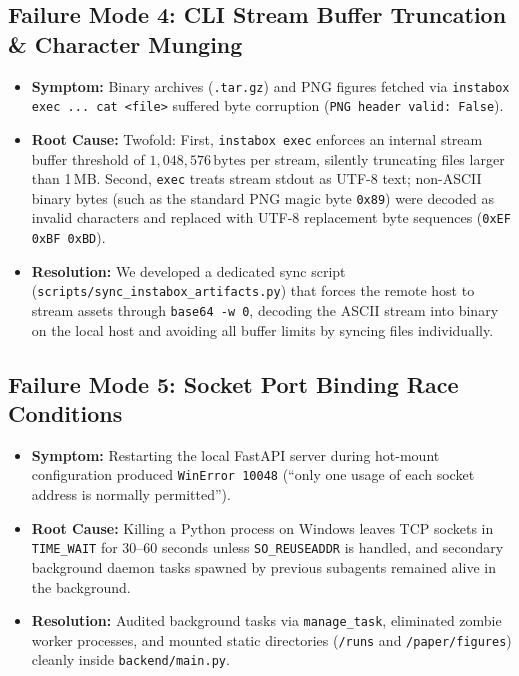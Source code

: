 \documentclass[11pt,a4paper]{article}
\begin{document}
\subsection{Failure Mode 4: CLI Stream Buffer Truncation \& Character Munging}
\begin{itemize}
    \item \textbf{Symptom:} Binary archives (\texttt{.tar.gz}) and PNG figures fetched via \texttt{instabox exec ... cat <file>} suffered byte corruption (\texttt{PNG header valid: False}).
    \item \textbf{Root Cause:} Twofold: First, \texttt{instabox exec} enforces an internal stream buffer threshold of $1,048,576\,\text{bytes}$ per stream, silently truncating files larger than 1\,MB. Second, \texttt{exec} treats stream stdout as UTF-8 text; non-ASCII binary bytes (such as the standard PNG magic byte \texttt{0x89}) were decoded as invalid characters and replaced with UTF-8 replacement byte sequences (\texttt{0xEF 0xBF 0xBD}).
    \item \textbf{Resolution:} We developed a dedicated sync script (\texttt{scripts/sync\_instabox\_artifacts.py}) that forces the remote host to stream assets through \texttt{base64 -w 0}, decoding the ASCII stream into binary on the local host and avoiding all buffer limits by syncing files individually.
\end{itemize}

\subsection{Failure Mode 5: Socket Port Binding Race Conditions}
\begin{itemize}
    \item \textbf{Symptom:} Restarting the local FastAPI server during hot-mount configuration produced \texttt{WinError 10048} (``only one usage of each socket address is normally permitted'').
    \item \textbf{Root Cause:} Killing a Python process on Windows leaves TCP sockets in \texttt{TIME\_WAIT} for 30--60 seconds unless \texttt{SO\_REUSEADDR} is handled, and secondary background daemon tasks spawned by previous subagents remained alive in the background.
    \item \textbf{Resolution:} Audited background tasks via \texttt{manage\_task}, eliminated zombie worker processes, and mounted static directories (\texttt{/runs} and \texttt{/paper/figures}) cleanly inside \texttt{backend/main.py}.
\end{itemize}
\end{document}
